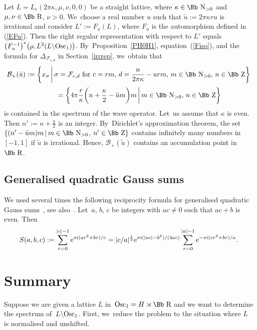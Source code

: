 \documentclass[pdftex]{sigma}
\newcommand\RR{{\mbox{\Bb R}}}
\newcommand\NN{{\mbox{\Bb N}}}
\newcommand\ZZ{{\mbox{\Bb Z}}}
\newcommand\cF{{\mathcal F}}
\newcommand\cB{{\mathcal B}}
\newcommand{\Osc}{{\rm Osc}}
\numberwithin{equation}{section}
\begin{document}
\begin{Example}
 Let $L=L_r(2\pi\kappa,\mu,\nu,0,0)$ be a straight lattice, where $\kappa\in\NN_{>0}$ and $\mu,\nu\in\RR$, $\nu>0$. We~choose a real number $u$ such that $\tilde u:=2\pi \kappa r u$ is irrational and consider $L':=F_u(L)$, where $F_u$ is the automorphism defined in (\ref{EFu}). Then the right regular representation with respect to $L'$ equals $\big(F_u^{-1}\big)^*\big(\rho, L^2(L\backslash\Osc_1)\big)$. By~Proposition~\ref{PH0H1}, equation~(\ref{Fiso}), and the formula for $\Delta_{\cF_{c,d}}$ in Section~\ref{irrrep}, we~obtain that
\begin{gather*}
\cB_+(\tilde u):=\bigg\{ x_\sigma\,\bigg|\, \sigma=\cF_{c,d} \mbox{ for } c=rm,\, d=\frac n{2\pi\kappa}-urm,\, m\in\NN_{>0},\, n\in\ZZ\bigg\}
\\[.5ex] \hphantom{\cB_+(\tilde u)\,}
{}=\bigg\{ 4\pi\frac r\kappa\bigg (n+\frac \kappa 2-\tilde u m\bigg)m\,\bigg|\, m\in\NN_{>0},\, n\in\ZZ\bigg\}
\end{gather*}
is contained in the spectrum of the wave operator. Let~us assume that $\kappa$ is even. Then $n':=n+\frac \kappa 2$ is an integer. By~Dirichlet's approximation theorem, the set
$\{(n'-\tilde u m)m\,|\,m\in\NN_{>0}$, $n'\in\ZZ\}$ contains infinitely many numbers in~$[-1,1]$ if $\tilde u$ is irrational. Hence, $\cB_+(\tilde u)$ contains an accumulation point in~$\RR$.
\end{Example}

\subsection{Generalised quadratic Gauss sums}
We used several times the following reciprocity formula for generalised quadratic Gauss sums~\cite{Si60}, see also~\cite{BE}. Let~$a$, $b$, $c$ be integers with $ac\not=0$ such that $ac+b$ is even. Then
\begin{gather}\label{qgs}
S(a,b,c):=\sum_{r=0}^{|c|-1} {\rm e}^{\pi {\rm i} (a r^2+br)/c}=|c/a|^{\frac12}{\rm e}^{\pi {\rm i}(|ac|-b^2)/(4ac)}\sum_{r=0}^{|a|-1} {\rm e}^{-\pi {\rm i}(cr^2+br)/a}.
\end{gather}

\section{Summary}\label{S9}
Suppose we are given a lattice $L$ in~$\Osc_1=H\rtimes \RR$ and we want to determine the spectrum of~$L\backslash \Osc_1$. First, we~reduce the problem to the situation where $L$ is normalised and unshifted.
\end{document}

